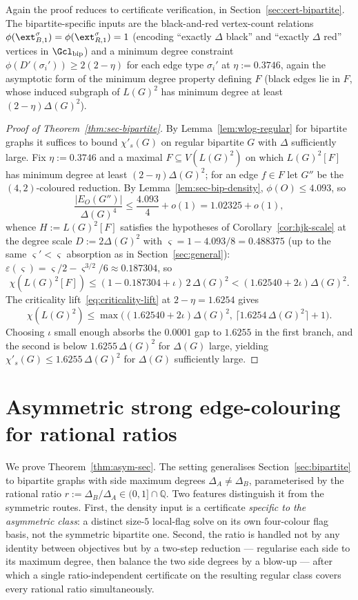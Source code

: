 \documentclass[11pt,a4paper]{article}
\theoremstyle{definition}
\theoremstyle{remark}
\begin{document}
Again the proof reduces to certificate verification, in
Section~\ref{sec:cert-bipartite}. The bipartite-specific inputs are the
black-and-red vertex-count relations $\phi(\ext_{B,1}^\sigma) =
\phi(\ext_{R,1}^\sigma) = 1$ (encoding ``exactly $\Delta$ black'' and
``exactly $\Delta$ red'' vertices in $\Gcl_{\mathrm{bip}}$) and a
minimum degree constraint $\phi(D'(\sigma_i')) \geq 2(2 - \eta)$ for each
edge type $\sigma_i'$ at $\eta := 0.3746$, again the asymptotic form
of the minimum degree property defining $F$ (black edges lie in $F$,
whose induced subgraph of $L(G)^2$ has minimum degree at least
$(2 - \eta)\Delta(G)^2$).

\begin{proof}[Proof of Theorem~\ref{thm:sec-bipartite}]
By Lemma~\ref{lem:wlog-regular} for bipartite graphs it suffices to
bound $\chi'_s(G)$ on regular bipartite $G$ with $\Delta$
sufficiently large. Fix $\eta := 0.3746$ and a maximal
$F \subseteq V(L(G)^2)$ on which $L(G)^2[F]$ has minimum degree at
least $(2 - \eta)\Delta(G)^2$; for an edge $f \in F$ let $G''$ be the
$(4,2)$-coloured reduction. By Lemma~\ref{lem:sec-bip-density},
$\phi(O) \leq 4.093$, so
\[
\frac{|E_O(G'')|}{\Delta(G)^4} \leq \frac{4.093}{4} + o(1)
= 1.02325 + o(1),
\]
whence $H := L(G)^2[F]$ satisfies the hypotheses of
Corollary~\ref{cor:hjk-scale} at the degree scale
$D := 2\Delta(G)^2$ with $\varsigma = 1 - 4.093/8 = 0.488375$ (up to
the same $\varsigma' < \varsigma$ absorption as in
Section~\ref{sec:general}):
$\varepsilon(\varsigma) = \varsigma/2 - \varsigma^{3/2}/6 \approx
0.187304$, so
\[
\chi(L(G)^2[F]) \leq (1 - 0.187304 + \iota)\,2\,\Delta(G)^2
< (1.62540 + 2\iota)\Delta(G)^2.
\]
The criticality lift~\eqref{eq:criticality-lift} at
$2 - \eta = 1.6254$ gives
\[
\chi(L(G)^2) \leq \max\bigl((1.62540 + 2\iota)\Delta(G)^2,\,
\lceil 1.6254\,\Delta(G)^2 \rceil + 1\bigr).
\]
Choosing $\iota$ small
enough absorbs the $0.0001$ gap to $1.6255$ in the first branch,
and the second is below $1.6255\,\Delta(G)^2$ for $\Delta(G)$ large,
yielding $\chi'_s(G) \leq 1.6255\,\Delta(G)^2$ for $\Delta(G)$
sufficiently large.
\end{proof}

\section{Asymmetric strong edge-colouring for rational ratios}
\label{sec:asym-sec}

We prove Theorem~\ref{thm:asym-sec}. The setting generalises
Section~\ref{sec:bipartite} to bipartite graphs with side maximum
degrees $\Delta_A \neq \Delta_B$, parameterised by the rational
ratio $r := \Delta_B / \Delta_A \in (0, 1] \cap \mathbb{Q}$. Two
features distinguish it from the symmetric routes. First, the density
input is a certificate \emph{specific to the asymmetric class}: a
distinct size-$5$ local-flag solve on its own four-colour flag basis,
not the symmetric bipartite one. Second, the ratio is handled not by any
identity between objectives but by a two-step reduction --- regularise
each side to its maximum degree, then balance the two side degrees by a
blow-up --- after which a single ratio-independent certificate on the
resulting regular class covers every rational ratio simultaneously.
\end{document}
